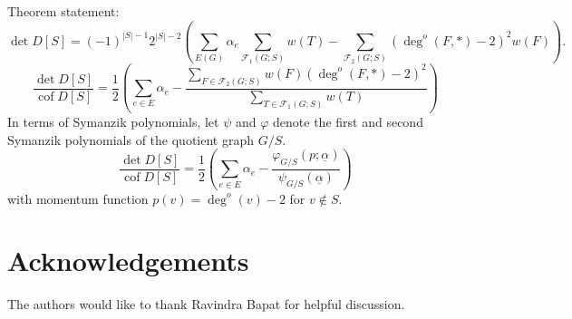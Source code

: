 \documentclass{amsart}
\theoremstyle{definition}
\DeclareMathOperator{\cof}{cof}
\newcommand{\trees}{\mathcal{F}_1}
\newcommand{\forests}{\mathcal{F}}
\newcommand{\degout}{\deg^o}
\begin{document}
Theorem statement:
\[
	\det D[S] = (-1)^{|S|-1} 2^{|S|-2} \left( \sum_{E(G)}\alpha_e \sum_{\trees(G;S)} w(T) - \sum_{\forests_2(G;S)} (\degout(F,*) - 2)^2 w(F) \right).
\]
\[
	\frac{\det D[S]}{\cof D[S]} = \frac12 \left( \sum_{e \in E} \alpha_e - \frac{\sum_{F \in \forests_2(G; S)} w(F) (\degout(F,*) - 2)^2}{\sum_{T \in \trees(G; S)} w(T)} \right)
\]
In terms of Symanzik polynomials, let $\psi$ and $\varphi$ denote the first and second Symanzik polynomials of the quotient graph $G/S$.
\[
	\frac{\det D[S]}{\cof D[S]} = \frac12 \left( \sum_{e \in E} \alpha_e - \frac{\varphi_{G/S}(p; \underline{\alpha})}{\psi_{G/S}(\underline{\alpha})} \right)
\]
with momentum function $p(v) = \degout(v) - 2$ for $v \not \in S$.


\section*{Acknowledgements}
The authors would like to thank Ravindra Bapat for helpful discussion.


 

\end{document}
